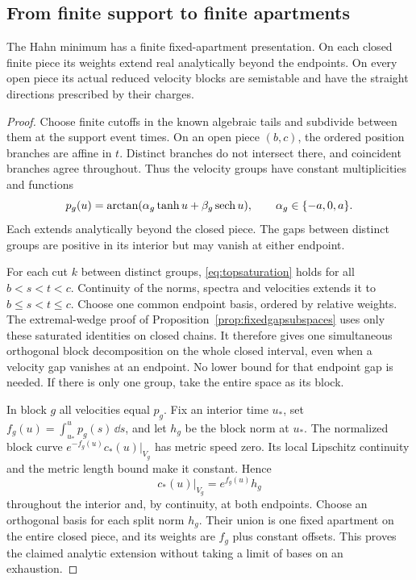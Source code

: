 \subsection{From finite support to finite apartments}

\begin{proposition}\label{prop:finitehahnregularity}
The Hahn minimum has a finite fixed-apartment presentation. On each
closed finite piece its weights extend real analytically beyond the
endpoints. On every open piece its actual reduced velocity blocks
are semistable and have the straight directions prescribed by their
charges.
\end{proposition}

\begin{proof}
Choose finite cutoffs in the known algebraic tails and subdivide
between them at the support event times. On an open piece $(b,c)$,
the ordered position branches are affine in $t$. Distinct branches
do not intersect there, and coincident branches agree throughout.
Thus the velocity groups have constant multiplicities and functions
\begin{equation}\label{eq:analyticvelocities}
 p_g(u)=\arctan(\alpha_g\tanh u+\beta_g\operatorname{sech} u),
 \qquad \alpha_g\in\{-a,0,a\}.
\end{equation}
Each extends analytically beyond the closed piece. The gaps
between distinct groups are positive in its interior but may
vanish at either endpoint.

For each cut $k$ between distinct groups,
\eqref{eq:topsaturation} holds for all $b<s<t<c$.
Continuity of the norms, spectra and velocities extends it to
$b\le s<t\le c$. Choose one common endpoint basis, ordered by
relative weights. The extremal-wedge proof of
Proposition~\ref{prop:fixedgapsubspaces} uses only these saturated
identities on closed chains. It therefore gives one simultaneous
orthogonal block decomposition on the whole closed interval,
even when a velocity gap vanishes at an endpoint. No lower bound
for that endpoint gap is needed. If there is only one group,
take the entire space as its block.

In block $g$ all velocities equal $p_g$. Fix an interior time
$u_*$, set $f_g(u)=\int_{u_*}^u p_g(s)\,\dd s$, and let
$h_g$ be the block norm at $u_*$. The normalized block curve
$e^{-f_g(u)}c_*(u)|_{V_g}$ has metric speed zero. Its local
Lipschitz continuity and the metric length bound make it constant.
Hence
\[
 c_*(u)|_{V_g}=e^{f_g(u)}h_g
\]
throughout the interior and, by continuity, at both endpoints.
Choose an orthogonal basis for each split norm $h_g$. Their union
is one fixed apartment on the entire closed piece, and its weights
are $f_g$ plus constant offsets. This proves the claimed analytic
extension without taking a limit of bases on an exhaustion.


\end{proof}
